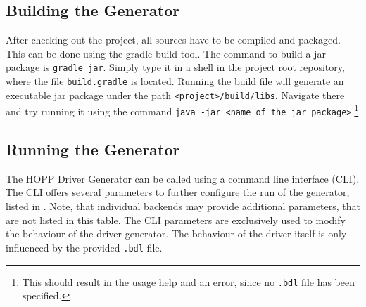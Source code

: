 \documentclass{report}
\begin{document}
\subsection{Building the Generator}
After checking out the project, all sources have to be compiled and packaged. This can be done using the gradle build tool. The command to build a jar package is \texttt{gradle jar}. Simply type it in a shell in the project root repository, where the file \texttt{build.gradle} is located. Running the build file will generate an executable jar package under the path \texttt{<project>/build/libs}. Navigate there and try running it using the command \texttt{java -jar <name of the jar package>}.\footnote{This should result in the usage help and an error, since no \texttt{.bdl} file has been specified.}

\subsection{Running the Generator}
The HOPP Driver Generator can be called using a command line interface (CLI). The CLI offers several parameters to further configure the run of the generator, listed in . Note, that individual backends may provide additional parameters, that are not listed in this table. The CLI parameters are exclusively used to modify the behaviour of the driver generator. The behaviour of the driver itself is only influenced by the provided \texttt{.bdl} file.
\end{document}
